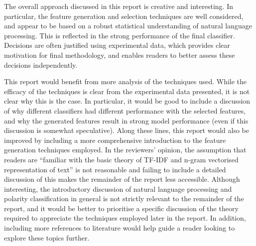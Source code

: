 \documentclass[11pt]{article}
\begin{document}
The overall approach discussed in this report is creative and interesting. In particular, the feature generation and selection techniques are well considered, and appear to be based on a robust statistical understanding of natural language processing. This is reflected in the strong performance of the final classifier. Decisions are often justified using experimental data, which provides clear motivation for final methodology, and enables readers to better assess these decisions independently.

This report would benefit from more analysis of the techniques used. While the efficacy of the techniques is clear from the experimental data presented, it is not clear why this is the case. In particular, it would be good to include a discussion of why different classifiers had different performance with the selected features, and why the generated features result in strong model performance (even if this discussion is somewhat speculative). Along these lines, this report would also be improved by including a more comprehensive introduction to the feature generation techniques employed. In the reviewers' opinion, the assumption that readers are ``familiar with the basic theory of TF-IDF and n-gram vectorised representation of text'' is not reasonable and failing to include a detailed discussion of this makes the remainder of the report less accessible. Although interesting, the introductory discussion of natural language processing and polarity classification in general is not strictly relevant to the remainder of the report, and it would be better to prioritise a specific discussion of the theory required to appreciate the techniques employed later in the report. In addition, including more references to literature would help guide a reader looking to explore these topics further.
\end{document}
